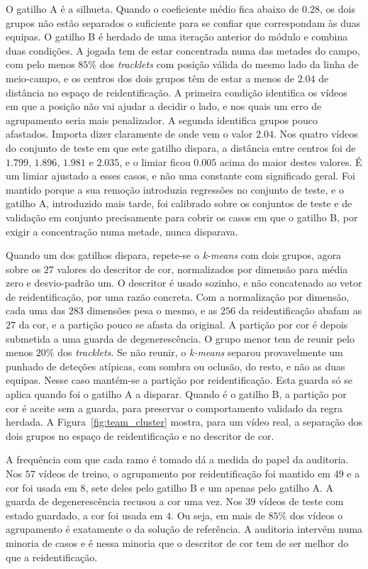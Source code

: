 O gatilho A é a silhueta. Quando o coeficiente médio fica abaixo de $0.28$, os dois grupos não
estão separados o suficiente para se confiar que correspondam às duas equipas. O gatilho B é
herdado de uma iteração anterior do módulo e combina duas condições. A jogada tem de estar
concentrada numa das metades do campo, com pelo menos $85\%$ dos \emph{tracklets} com posição
válida do mesmo lado da linha de meio-campo, e os centros dos dois grupos têm de estar a menos de
$2.04$ de distância no espaço de reidentificação. A primeira condição identifica os vídeos em que
a posição não vai ajudar a decidir o lado, e nos quais um erro de agrupamento seria mais
penalizador. A segunda identifica grupos pouco afastados. Importa dizer claramente de onde vem o
valor $2.04$. Nos quatro vídeos do conjunto de teste em que este gatilho dispara, a distância
entre centros foi de $1.799$, $1.896$, $1.981$ e $2.035$, e o limiar ficou $0.005$ acima do maior
destes valores. É um limiar ajustado a esses casos, e não uma constante com significado
geral. Foi mantido porque a sua remoção introduzia regressões no conjunto de teste, e o gatilho A,
introduzido mais tarde, foi calibrado sobre os conjuntos de teste e de validação em conjunto
precisamente para cobrir os casos em que o gatilho B, por exigir a concentração numa metade, nunca
disparava.

Quando um dos gatilhos dispara, repete-se o \emph{k-means} com dois grupos, agora sobre os $27$
valores do descritor de cor, normalizados por dimensão para média zero e desvio-padrão um. O
descritor é usado sozinho, e não concatenado ao vetor de reidentificação, por uma razão
concreta. Com a normalização por dimensão, cada uma das $283$ dimensões pesa o mesmo, e as $256$ da
reidentificação abafam as $27$ da cor, e a partição pouco se afasta da original. A partição por cor é depois submetida a uma guarda de
degenerescência. O grupo menor tem de reunir pelo menos $20\%$ dos \emph{tracklets}. Se não
reunir, o \emph{k-means} separou provavelmente um punhado de deteções atípicas, com sombra ou
oclusão, do resto, e não as duas equipas. Nesse caso mantém-se a partição por reidentificação.
Esta guarda só se aplica quando foi o gatilho A a disparar. Quando é o gatilho B, a partição por
cor é aceite sem a guarda, para preservar o comportamento validado da regra herdada. A
Figura~\ref{fig:team_cluster} mostra, para um vídeo real, a separação dos dois grupos no espaço de
reidentificação e no descritor de cor.

A frequência com que cada ramo é tomado dá a medida do papel da auditoria. Nos $57$ vídeos de
treino, o agrupamento por reidentificação foi mantido em $49$ e a cor foi usada em $8$, sete deles
pelo gatilho B e um apenas pelo gatilho A. A guarda de degenerescência recusou a cor uma vez. Nos
$39$ vídeos de teste com estado guardado, a cor foi usada em $4$. Ou seja, em mais de $85\%$ dos
vídeos o agrupamento é exatamente o da solução de referência. A auditoria intervém numa minoria de
casos e é nessa minoria que o descritor de cor tem de ser melhor do que a reidentificação.

